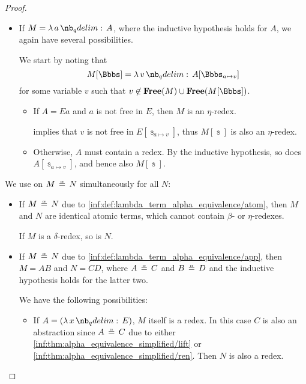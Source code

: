 \begin{proof}
\begin{itemize}
    \item If \( M = \qabs a A \), where the inductive hypothesis holds for \( A \), we again have several possibilities.

    We start by noting that
    \begin{equation*}
      M[\Bbbs] = \qabs v A[\Bbbs_{a \mapsto v}]
    \end{equation*}
    for some variable \( v \) such that \( v \not\in \op*{Free}(M) \cup \op*{Free}(M[\Bbbs]) \).

    \begin{itemize}
      \item If \( A = Ea \) and \( a \) is not free in \( E \), then \( M \) is an \( \eta \)-redex.

       implies that \( v \) is not free in \( E[\Bbbs_{a \mapsto v}] \), thus \( M[\Bbbs] \) is also an \( \eta \)-redex.

      \item Otherwise, \( A \) must contain a redex. By the inductive hypothesis, so does \( A[\Bbbs_{a \mapsto v}] \), and hence also \( M[\Bbbs] \).
    \end{itemize}
  \end{itemize}

   We use  on \( M \aequiv N \) simultaneously for all \( N \):
  \begin{itemize}
    \item If \( M \aequiv N \) due to \ref{inf:def:lambda_term_alpha_equivalence/atom}, then \( M \) and \( N \) are identical atomic terms, which cannot contain \( \beta \)- or \( \eta \)-redexes.

    If \( M \) is a \( \delta \)-redex, so is \( N \).

    \item If \( M \aequiv N \) due to \ref{inf:def:lambda_term_alpha_equivalence/app}, then \( M = AB \) and \( N = CD \), where \( A \aequiv C \) and \( B \aequiv D \) and the inductive hypothesis holds for the latter two.

    We have the following possibilities:
    \begin{itemize}
      \item If \( A = (\qabs x E) \), \( M \) itself is a redex. In this case \( C \) is also an abstraction since \( A \aequiv C \) due to either \ref{inf:thm:alpha_equivalence_simplified/lift} or \ref{inf:thm:alpha_equivalence_simplified/ren}. Then \( N \) is also a redex.


\end{itemize}
\end{itemize}
\end{proof}
